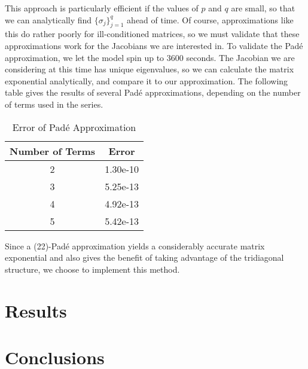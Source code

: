 \documentclass{csri19}
\begin{document}
This approach is particularly efficient if the values of $p$ and $q$ are small, so that we can analytically find $\{\sigma_j\}_{j=1}^q$ ahead of time.
Of course, approximations like this do rather poorly for ill-conditioned matrices, so we must validate that these approximations work for the Jacobians we are interested in.
To validate the Pad\'e approximation, we let the model spin up to $3600$ seconds. The Jacobian we are considering at this time has unique eigenvalues, so we can calculate the matrix exponential analytically, and compare it to our approximation.
The following table gives the results of several Pad\'e approximations, depending on the number of terms used in the series.
\begin{table}[ht]
  \begin{center}
    \caption{Error of Pad\'e Approximation}
    \label{CFK:tab:PadeError}
    \begin{tabular}{|c|c|}
      \hline
      \textbf{Number of Terms} & \textbf{Error}\\
      \hline
      2 & 1.30e-10 \\
      3 & 5.25e-13 \\
      4 & 4.92e-13 \\
      5 & 5.42e-13 \\
      \hline
    \end{tabular}
  \end{center}
\end{table}

Since a (22)-Pad\'e approximation yields a considerably accurate matrix exponential and also gives the benefit of taking advantage of the tridiagonal structure, we choose to implement this method.

\newpage
\section{Results}\label{CFK:sec:results}

\section{Conclusions}




%
\end{document}
